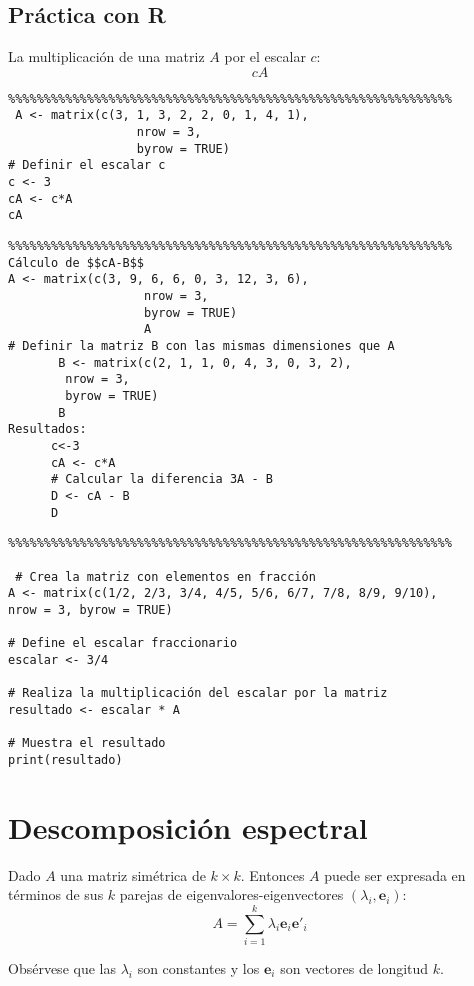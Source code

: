 \subsection{Práctica con R}
La multiplicación de una matriz $A$ por el escalar $c$: $$cA$$

\begin{verbatim}
%%%%%%%%%%%%%%%%%%%%%%%%%%%%%%%%%%%%%%%%%%%%%%%%%%%%%%%%%%%%%%
 A <- matrix(c(3, 1, 3, 2, 2, 0, 1, 4, 1),
                  nrow = 3,
                  byrow = TRUE)
# Definir el escalar c
c <- 3
cA <- c*A
cA
\end{verbatim}


\begin{verbatim}
%%%%%%%%%%%%%%%%%%%%%%%%%%%%%%%%%%%%%%%%%%%%%%%%%%%%%%%%%%%%%%
Cálculo de $$cA-B$$
A <- matrix(c(3, 9, 6, 6, 0, 3, 12, 3, 6),
                   nrow = 3, 
                   byrow = TRUE)
                   A
# Definir la matriz B con las mismas dimensiones que A
       B <- matrix(c(2, 1, 1, 0, 4, 3, 0, 3, 2),
        nrow = 3,
        byrow = TRUE)
       B
Resultados:
      c<-3
      cA <- c*A
      # Calcular la diferencia 3A - B
      D <- cA - B
      D    
\end{verbatim}
\begin{verbatim}
%%%%%%%%%%%%%%%%%%%%%%%%%%%%%%%%%%%%%%%%%%%%%%%%%%%%%%%%%%%%%%

 # Crea la matriz con elementos en fracción
A <- matrix(c(1/2, 2/3, 3/4, 4/5, 5/6, 6/7, 7/8, 8/9, 9/10), 
nrow = 3, byrow = TRUE)

# Define el escalar fraccionario
escalar <- 3/4

# Realiza la multiplicación del escalar por la matriz
resultado <- escalar * A

# Muestra el resultado
print(resultado)   
\end{verbatim}
\section{Descomposición espectral}

\begin{definition}
Dado $A$ una matriz simétrica de $k\times k$. Entonces $A$ puede ser expresada en términos de sus $k$ parejas de eigenvalores-eigenvectores $(\lambda_{i},\textbf{e}_{i})$: 
$$
A=\sum_{i=1}^{k}\lambda_{i}\textbf{e}_{i}\textbf{e}'_{i}
$$
\end{definition}

Obsérvese que las $\lambda_i$ son constantes y los $\textbf{e}_{i}$ son vectores de longitud $k$.


